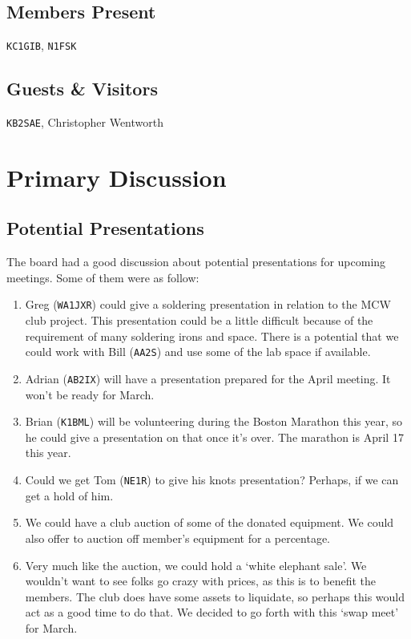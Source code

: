 \documentclass[10pt,letterpaper]{article}
\begin{document}
\subsection{Members Present}
\texttt{KC1GIB},
\texttt{N1FSK}

\subsection{Guests \& Visitors}
\texttt{KB2SAE},
Christopher Wentworth

\section{Primary Discussion}

\subsection{Potential Presentations}
The board had a good discussion about potential presentations for upcoming meetings. Some of them were as follow:
\begin{enumerate}
  \item Greg (\texttt{WA1JXR}) could give a soldering presentation in relation to the MCW club project. This presentation could be a little difficult because of the requirement of many soldering irons and space. There is a potential that we could work with Bill (\texttt{AA2S}) and use some of the lab space if available.
  \item Adrian (\texttt{AB2IX}) will have a presentation prepared for the April meeting. It won't be ready for March.
  \item Brian (\texttt{K1BML}) will be volunteering during the Boston Marathon this year, so he could give a presentation on that once it's over. The marathon is April 17 this year.
  \item Could we get Tom (\texttt{NE1R}) to give his knots presentation? Perhaps, if we can get a hold of him.
  \item We could have a club auction of some of the donated equipment. We could also offer to auction off member's equipment for a percentage.
  \item Very much like the auction, we could hold a `white elephant sale'. We wouldn't want to see folks go crazy with prices, as this is to benefit the members. The club does have some assets to liquidate, so perhaps this would act as a good time to do that. We decided to go forth with this `swap meet' for March.
\end{enumerate}
\end{document}
